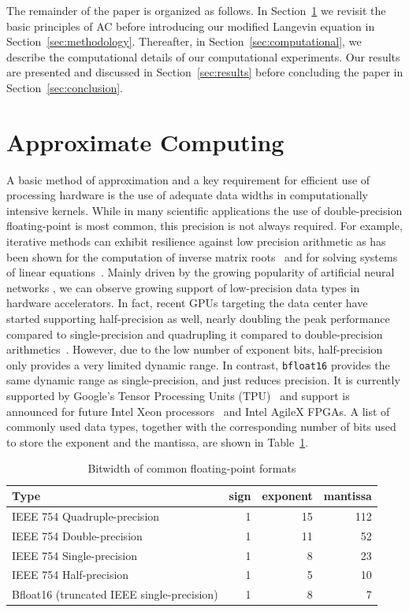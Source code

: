 \documentclass[preprint]{elsarticle}
\begin{document}
The remainder of the paper is organized as follows. In Section~\ref{sec:ac} we revisit the basic principles of AC before introducing our modified Langevin equation in Section~\ref{sec:methodology}. Thereafter, in Section~\ref{sec:computational}, we describe the computational details of our computational experiments. Our results are presented and discussed in Section~\ref{sec:results} before concluding the paper in Section~\ref{sec:conclusion}.


\section{Approximate Computing}
\label{sec:ac}

A basic method of approximation and a key requirement for efficient use of processing hardware is the use of adequate data widths in computationally intensive kernels. While in many scientific applications the use of double-precision floating-point is most common, this precision is not always required.
For example, iterative methods can exhibit resilience against low precision arithmetic as has been shown for the computation of inverse matrix roots~\cite{lass17-esl} and for solving systems of linear equations~\cite{KlavikMalossiBekasEtAl2014,Bekas,Dongarra2017,Dongarra2018}.
Mainly driven by the growing popularity of artificial neural networks \cite{Gupta2015}, we can observe growing support of low-precision data types
in hardware accelerators.
In fact, recent GPUs targeting the data center have started supporting half-precision as well, nearly doubling the peak performance compared to single-precision and quadrupling it compared to double-precision arithmetics~\cite{tesla}. However, due to the low number of exponent bits, half-precision only provides a very limited dynamic range. In contrast, \texttt{bfloat16} provides the same dynamic range as single-precision, and just reduces precision. It is currently supported by Google's Tensor Processing Units (TPU)~\cite{tpu} and support is announced for future Intel Xeon processors~\cite{xeon} and Intel AgileX FPGAs. A list of commonly used data types, together with the corresponding number of bits used to store the exponent and the mantissa, are shown in Table~\ref{tab:float}.
\begin{table}
  \caption{Bitwidth of common floating-point formats}
  \centering
  \label{tab:float}
  \begin{tabular}{lrrr}
    Type & sign & exponent & mantissa \\
    \hline
    IEEE 754 Quadruple-precision & 1 & 15 & 112 \\
    IEEE 754 Double-precision & 1 & 11 & 52 \\
    IEEE 754 Single-precision & 1 & 8 & 23 \\
    IEEE 754 Half-precision & 1 & 5 & 10 \\
    Bfloat16 (truncated IEEE single-precision) & 1 & 8 & 7
  \end{tabular}
\end{table}
\end{document}
